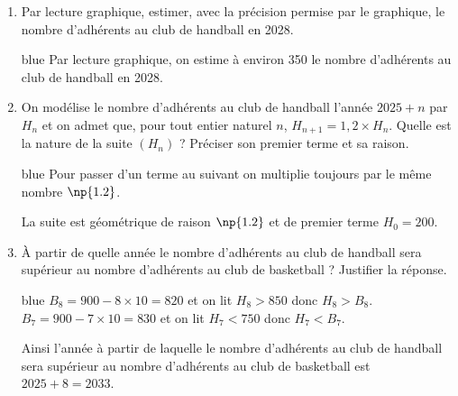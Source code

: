 	\begin{enumerate}[start=4]
		\item Par lecture graphique, estimer, avec la précision permise par le graphique, le nombre d'adhérents au club de handball en 2028.
		
		
		\begin{color}{blue}
		Par lecture graphique, on estime à environ 350 le nombre d'adhérents au club de handball en 2028.
		\end{color}
		
		
		\item On modélise le nombre d'adhérents au club de handball l'année $2025+n$ par $H_{n}$ et on admet que, pour tout entier naturel $n$, $H_{n+1}=1{,}2\times H_{n}$. Quelle est la nature de la suite $\left(H_{n}\right)$ ? Préciser son premier terme et sa raison.
		
		\begin{color}{blue}
		Pour passer d'un terme au suivant on multiplie toujours par le même nombre $\np{1.2}$.
		
		La suite est géométrique de raison $\np{1.2}$ et de premier terme $H_{0} = 200$.
		\end{color}
		
		\item À partir de quelle année le nombre d'adhérents au club de handball sera supérieur au nombre d'adhérents au club de basketball ? Justifier la réponse.
		
		\begin{color}{blue}
		$B_{8} = 900 - 8 \times 10 = 820 $ et on lit $H_{8} > 850$ donc $H_{8} > B_{8}$.
		$B_{7} = 900 - 7 \times 10 = 830 $ et on lit $H_{7} < 750$ donc $H_{7} < B_{7}$.
		
		Ainsi l'année à partir de laquelle le nombre d'adhérents au club de handball sera supérieur au nombre d'adhérents au club de basketball est $2025+8 = 2033$.
		\end{color}
		
	\end{enumerate}
